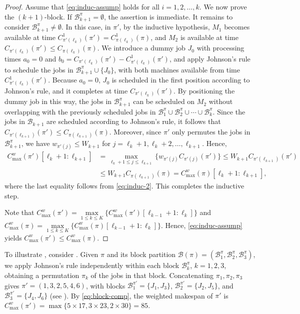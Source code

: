 ﻿\documentclass[12pt]{article} \textheight=24.5cm \textwidth=16.5cm \parskip = 0.165cm
\begin{document}
\begin{sloppypar}
\begin{proof}
        Assume that \cref{eq:induc-assump} holds for all $i=1, 2, \ldots, k$.
        We now prove the $(k+1)$-block.
        If $\mathcal{B}_{k+1}^{\pi}=\emptyset$, the assertion is immediate.
        It remains to consider $\mathcal{B}_{k+1}^{\pi} \neq \emptyset$.
        In this case, in $\pi'$, by the inductive hypothesis, $M_1$ becomes available at time $C_{\pi'(\ell_k)}^1(\pi')=C_{\pi(\ell_k)}^1(\pi)$, and $M_2$ is available at time $C_{\pi'(\ell_k)}(\pi') \leq C_{\pi(\ell_k)}(\pi)$.
        We introduce a dummy job $J_0$ with processing times $a_0=0$ and $b_0=C_{\pi'(\ell_k)}(\pi')-C_{\pi'(\ell_k)}^1(\pi')$, and apply Johnson's rule to schedule the jobs in $\mathcal{B}_{k+1}^{\pi} \cup \{J_0\}$, with both machines available from time $C_{\pi'(\ell_k)}^1(\pi')$.
        Because $a_0=0$, $J_0$ is scheduled in the first position according to Johnson's rule, and it completes at time $C_{\pi'(\ell_k)}(\pi')$.
        By positioning the dummy job in this way, the jobs in $\mathcal{B}_{k+1}^{\pi}$ can be scheduled on $M_2$ without overlapping with the previously scheduled jobs in $\mathcal{B}_1^{\pi} \cup \mathcal{B}_2^{\pi} \cup \cdots \cup \mathcal{B}_k^{\pi}$.
        Since the jobs in $\mathcal{B}_{k+1}$ are scheduled according to Johnson's rule, it follows that $C_{\pi'(\ell_{k+1})} (\pi') \leq C_{\pi(\ell_{k+1})}(\pi)$.
        Moreover, since $\pi'$ only permutes the jobs in $\mathcal{B}_{k+1}^{\pi}$, we have $w_{\pi'(j)} \leq W_{k+1}$ for $j=\ell_k+1, \ell_k+2, \ldots, \ell_{k+1}$.
        Hence,
            \begin{align*}
                C_{\max}^w(\pi')[\ell_k+1:\ell_{k+1}] & = \max_{\ell_k+1 \leq j \leq \ell_{k+1}}\{w_{\pi'(j)}C_{\pi'(j)}(\pi')\} \leq W_{k+1} C_{\pi'(\ell_{k+1})}(\pi') \\
                & \leq W_{k+1} C_{\pi(\ell_{k+1})}(\pi)=C_{\max}^w(\pi)[\ell_k+1:\ell_{k+1}],
            \end{align*}
        where the last equality follows from \cref{eq:induc-2}.
        This completes the inductive step.

        Note that $C_{\max}^w(\pi')=\max\limits_{1 \leq k \leq K} \{C_{\max}^w(\pi')[\ell_{k-1}+1:\ell_k]\}$ and $C_{\max}^w(\pi)=\max\limits_{1 \leq k \leq K} \{C_{\max}^w(\pi)[\ell_{k-1}+1:\ell_k]\}$.
        Hence, \cref{eq:induc-assump} yields $C_{\max}^w(\pi') \leq C_{\max}^w(\pi)$.
        \end{proof}

        To illustrate , consider .
        Given $\pi$ and its block partition $\mathcal{B}(\pi)=(\mathcal{B}_1^{\pi}, \mathcal{B}_2^{\pi}, \mathcal{B}_3^{\pi})$, we apply Johnson’s rule independently within each block $\mathcal{B}_k^{\pi}$, $k=1, 2, 3$, obtaining a permutation $\pi_k$ of the jobs in that block.
        Concatenating $\pi_1, \pi_2, \pi_3$ gives $\pi'=(1, 3, 2, 5, 4, 6)$, with blocks $\mathcal{B}_1^{\pi'}=\{J_1,J_3\}$, $\mathcal{B}_2^{\pi'}=\{J_2,J_5\}$, and $\mathcal{B}_3^{\pi'}=\{J_4, J_6\}$ (see ).
        By \cref{eq:block-comp}, the weighted makespan of $\pi'$ is $C_{\max}^w(\pi')=\max \{5 \times 17, 3 \times 23, 2 \times 30\}=85$.


\end{sloppypar}
\end{document}
